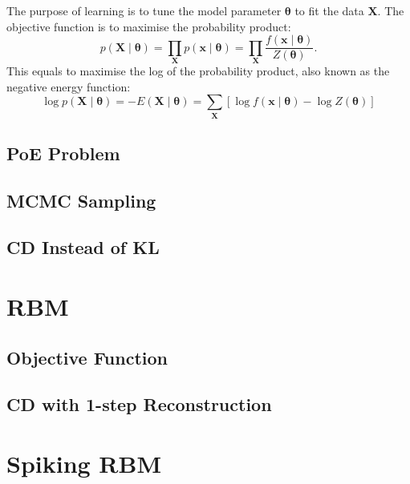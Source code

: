 \documentclass[11pt,twoside,a4paper]{article}
\begin{document}
The purpose of learning is to tune the model parameter $ \mathbf{\theta} $ to fit the data $ \mathbf{X}  $. 
The objective function is to maximise the probability product:
 \begin{equation}
 p(\mathbf{X} \mid \mathbf{\theta} ) = \prod_\mathbf{X} p(\mathbf{x} \mid \mathbf{\theta} ) =  \prod_\mathbf{X}\dfrac{f(\mathbf{x} \mid \mathbf{\theta} )}{Z( \mathbf{\theta})}.
 \end{equation}
 This equals to maximise the log of the probability product, also known as the negative energy function:
  \begin{equation}
  \log p(\mathbf{X} \mid \mathbf{\theta} ) = -E(\mathbf{X} \mid \mathbf{\theta} )  =  \sum_\mathbf{X}[\log f(\mathbf{x} \mid \mathbf{\theta} ) - \log Z( \mathbf{\theta})] 
  \end{equation}
\subsection{PoE Problem}
\subsection{MCMC Sampling}
\subsection{CD Instead of KL}
\section{RBM\cite{zhang2013rbm}}
\subsection{Objective Function}
\subsection{CD with 1-step Reconstruction}
\section{Spiking RBM\cite{neftci2013event}}

 

\end{document}
